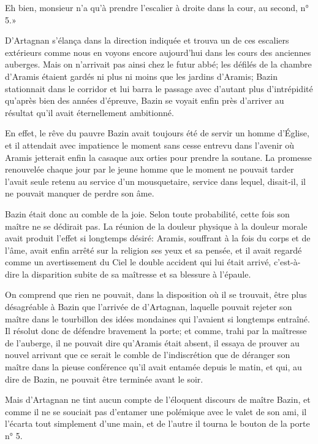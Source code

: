 \speak  Eh bien, monsieur n'a qu'à prendre l'escalier à droite dans la cour, au second, n° 5.» 

D'Artagnan s'élança dans la direction indiquée et trouva un de ces escaliers extérieurs comme nous en voyons encore aujourd'hui dans les cours des anciennes auberges. Mais on n'arrivait pas ainsi chez le futur abbé; les défilés de la chambre d'Aramis étaient gardés ni plus ni moins que les jardins d'Aramis; Bazin stationnait dans le corridor et lui barra le passage avec d'autant plus d'intrépidité qu'après bien des années d'épreuve, Bazin se voyait enfin près d'arriver au résultat qu'il avait éternellement ambitionné. 

En effet, le rêve du pauvre Bazin avait toujours été de servir un homme d'Église, et il attendait avec impatience le moment sans cesse entrevu dans l'avenir où Aramis jetterait enfin la casaque aux orties pour prendre la soutane. La promesse renouvelée chaque jour par le jeune homme que le moment ne pouvait tarder l'avait seule retenu au service d'un mousquetaire, service dans lequel, disait-il, il ne pouvait manquer de perdre son âme. 

Bazin était donc au comble de la joie. Selon toute probabilité, cette fois son maître ne se dédirait pas. La réunion de la douleur physique à la douleur morale avait produit l'effet si longtemps désiré: Aramis, souffrant à la fois du corps et de l'âme, avait enfin arrêté sur la religion ses yeux et sa pensée, et il avait regardé comme un avertissement du Ciel le double accident qui lui était arrivé, c'est-à-dire la disparition subite de sa maîtresse et sa blessure à l'épaule. 

On comprend que rien ne pouvait, dans la disposition où il se trouvait, être plus désagréable à Bazin que l'arrivée de d'Artagnan, laquelle pouvait rejeter son maître dans le tourbillon des idées mondaines qui l'avaient si longtemps entraîné. Il résolut donc de défendre bravement la porte; et comme, trahi par la maîtresse de l'auberge, il ne pouvait dire qu'Aramis était absent, il essaya de prouver au nouvel arrivant que ce serait le comble de l'indiscrétion que de déranger son maître dans la pieuse conférence qu'il avait entamée depuis le matin, et qui, au dire de Bazin, ne pouvait être terminée avant le soir. 

Mais d'Artagnan ne tint aucun compte de l'éloquent discours de maître Bazin, et comme il ne se souciait pas d'entamer une polémique avec le valet de son ami, il l'écarta tout simplement d'une main, et de l'autre il tourna le bouton de la porte n° 5. 

